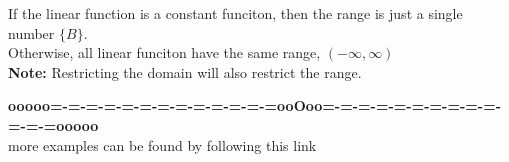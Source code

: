 \documentclass{ximera}
\begin{document}
If the linear function is a constant funciton, then the range is just a single number $\{ B \}$. \\

Otherwise, all linear funciton have the same range, $(-\infty, \infty)$ \\

\textbf{Note:} Restricting the domain will also restrict the range.\\
























\begin{center}
\textbf{\textcolor{green!50!black}{ooooo=-=-=-=-=-=-=-=-=-=-=-=-=ooOoo=-=-=-=-=-=-=-=-=-=-=-=-=ooooo}} \\

more examples can be found by following this link\\ 

\end{center}
\end{document}
